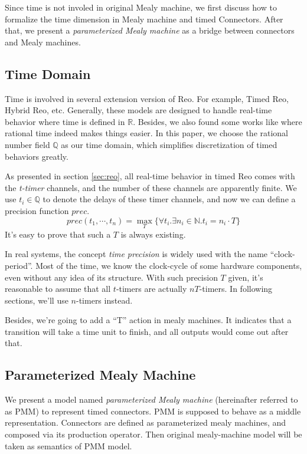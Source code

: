 \documentclass[conference, a4paper]{IEEEtran}
\begin{document}
Since time is not involed in original Mealy machine, we first discuss how to formalize the time
dimension in Mealy machine and timed Connectors. After that, we present a \emph{parameterized Mealy
machine} as a bridge between connectors and Mealy machines.

\subsection{Time Domain}
Time is involved in several extension version of Reo. For example, Timed
Reo\cite{DBLP:conf/sefm/ArbabBBR04}, Hybrid Reo\cite{DBLP:conf/icfem/ChenSS14}, etc.
Generally, these models are designed to handle real-time behavior where time is defined in
$\mathbb{R}$. Besides, we also found some works like \cite{DBLP:journals/fmsd/PrabhakarDM015} where
rational time indeed  makes things easier. In this paper, we choose the rational number field
$\mathbb{Q}$ as our time domain, which simplifies discretization of timed behaviors greatly.

As presented in section \ref{sec:reo}, all real-time behavior in timed Reo comes with the
\emph{t-timer} channels, and the number of these channels are apparently finite. We use
$t_i\in\mathbb{Q}$ to denote the delays of these timer channels, and now we can define a precision
function $prec$.
\[
prec(t_1,\cdots,t_n) = \max_T\{\forall t_i.\exists n_i\in\mathbb{N}.t_i=n_i\cdot T\}
\]
It's easy to prove that such a $T$ is always existing.

In real systems, the concept \emph{time precision} is widely used with the name ``clock-period''.
Most of the time, we know the clock-cycle of some hardware components, even without any idea of its
structure. With such precision $T$ given, it's reasonable to assume that all $t$-timers are actually
$nT$-timers. In following sections, we'll use $n$-timers instead.

Besides, we're going to add a ``T'' action in mealy machines. It indicates that a transition
will take a time unit to finish, and all outputs would come out after that.

\subsection{Parameterized Mealy Machine}
We present a model named \emph{parameterized Mealy machine} (hereinafter referred to as PMM)
to represent timed connectors. PMM is supposed to behave as a middle representation. Connectors are
defined as parameterized mealy machines, and composed via its production operator. Then original
mealy-machine model will be taken as semantics of PMM model.
\end{document}

